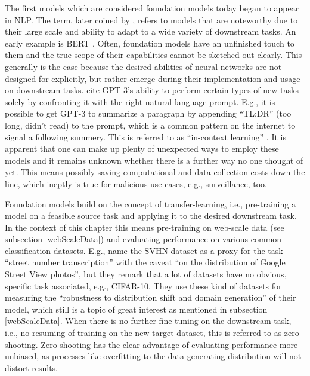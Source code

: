\documentclass[
]{krantz}
\begin{document}
The first models which are considered foundation models today began to appear in NLP.
The term, later coined by \citet{bommasani2021opportunities}, refers to models that are noteworthy due to their large scale and ability to adapt to a wide variety of downstream tasks.
An early example is BERT \citep{Devlin2018}.
Often, foundation models have an unfinished touch to them and the true scope of their capabilities cannot be sketched out clearly.
This generally is the case because the desired abilities of neural networks are not designed for explicitly, but rather emerge during their implementation and usage on downstream tasks.
\citet{bommasani2021opportunities} cite GPT-3's ability to perform certain types of new tasks solely by confronting it with the right natural language prompt.
E.g., it is possible to get GPT-3 to summarize a paragraph by appending ``TL;DR'' (too long, didn't read) to the prompt, which is a common pattern on the internet to signal a following summery.
This is referred to as ``in-context learning'' \citep{brown2020language}.
It is apparent that one can make up plenty of unexpected ways to employ these models and it remains unknown whether there is a further way no one thought of yet.
This means possibly saving computational and data collection costs down the line, which ineptly is true for malicious use cases, e.g., surveillance, too.

Foundation models build on the concept of transfer-learning, i.e., pre-training a model on a feasible source task and applying it to the desired downstream task.
In the context of this chapter this means pre-training on web-scale data (see subsection \ref{webScaleData}) and evaluating performance on various common classification datasets.
E.g., \citet{radford2021learning} name the SVHN dataset as a proxy for the task ``street number transcription'' with the caveat ``on the distribution of Google Street View photos'', but they remark that a lot of datasets have no obvious, specific task associated, e.g., CIFAR-10.
They use these kind of datasets for measuring the ``robustness to distribution shift and domain generation'' of their model, which still is a topic of great interest as mentioned in subsection \ref{webScaleData}.
When there is no further fine-tuning on the downstream task, i.e., no resuming of training on the new target dataset, this is referred to as zero-shooting.
Zero-shooting has the clear advantage of evaluating performance more unbiased, as processes like overfitting to the data-generating distribution will not distort results.
\end{document}
